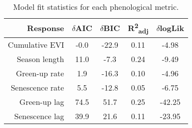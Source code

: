\begin{table}[ht]
\centering
\begin{tabular}{rcccc}
  \hline
Response & $\delta$AIC & $\delta$BIC & R\textsuperscript{2}\textsubscript{adj} & $\delta$logLik \\ 
  \hline
Cumulative EVI & -0.0 & -22.9 & 0.11 & -4.98 \\ 
  Season length & 11.0 & -7.3 & 0.24 & -9.49 \\ 
  Green-up rate & 1.9 & -16.3 & 0.10 & -4.96 \\ 
  Senescence rate & 5.5 & -12.8 & 0.05 & -6.75 \\ 
  Green-up lag & 74.5 & 51.7 & 0.25 & -42.25 \\ 
  Senescence lag & 39.9 & 21.6 & 0.11 & -23.95 \\ 
   \hline
\end{tabular}
\caption{Model fit statistics for each phenological metric.} 
\label{mod_stat}
\end{table}

